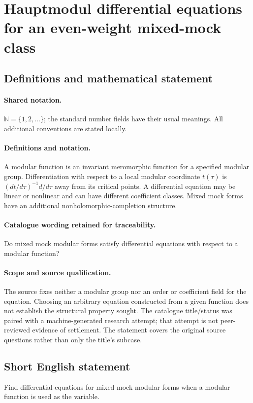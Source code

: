 \documentclass[11pt]{article}
\begin{document}
\section{Hauptmodul differential equations for an even-weight mixed-mock class}\label{statement}

\subsection{Definitions and mathematical statement}

\paragraph{Shared notation.}$\mathbb N=\{1,2,\ldots\}$; the standard number fields have their usual meanings. All additional conventions are stated locally.


\paragraph{Definitions and notation.}A modular function is an invariant meromorphic function for a specified modular group. Differentiation with respect to a local modular coordinate $t(\tau)$ is $(dt/d\tau)^{-1}d/d\tau$ away from its critical points. A differential equation may be linear or nonlinear and can have different coefficient classes. Mixed mock forms have an additional nonholomorphic-completion structure.

\paragraph{Catalogue wording retained for traceability.}
Do mixed mock modular forms satisfy differential equations with respect to a modular function?
\paragraph{Scope and source qualification.}The source fixes neither a modular group nor an order or coefficient field for the equation. Choosing an arbitrary equation constructed from a given function does not establish the structural property sought. The catalogue title/status was paired with a machine-generated research attempt; that attempt is not peer-reviewed evidence of settlement. The statement covers the original source questions rather than only the title’s subcase.
\subsection{Short English statement}
Find differential equations for mixed mock modular forms when a modular function is used as the variable.
\end{document}
